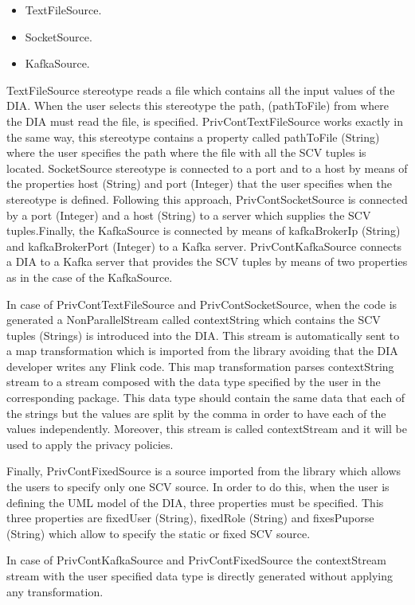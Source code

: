 \begin{itemize}
\item TextFileSource.
\item SocketSource.
\item KafkaSource.
\end{itemize}

TextFileSource stereotype reads a file which contains all the input values of the DIA. When the user selects this stereotype the path, (pathToFile) from where the DIA must read the file, is specified. PrivContTextFileSource works exactly in the same way, this stereotype contains a property called pathToFile (String) where the user specifies the path where the file with all the SCV tuples is located. SocketSource stereotype is connected to a port and to a host by means of the properties host (String) and port (Integer) that the user specifies when the stereotype is defined. Following this approach, PrivContSocketSource is connected by a port (Integer) and a host (String) to a server which supplies the SCV tuples.Finally, the KafkaSource is connected by means of kafkaBrokerIp (String) and kafkaBrokerPort (Integer) to a Kafka server. PrivContKafkaSource connects a DIA to a Kafka server that provides the SCV tuples by means of two properties as in the case of the KafkaSource.

In case of PrivContTextFileSource and PrivContSocketSource, when the code is generated a NonParallelStream called contextString which contains the SCV tuples (Strings) is introduced into the DIA. This stream is automatically sent to a map transformation which is imported from the library avoiding that the DIA developer writes any Flink code. This map transformation parses contextString stream to a stream composed with the data type specified by the user in the corresponding package. This data type should contain the same data that each of the strings but the values are split by the comma in order to have each of the values independently. Moreover, this stream is called contextStream and it will be used to apply the privacy policies.

Finally, PrivContFixedSource is a source imported from the library which allows the users to specify only one SCV source. In order to do this, when the user is defining the UML model of the DIA, three properties must be specified. This three properties are fixedUser (String), fixedRole (String) and fixesPuporse (String) which allow to specify the static or fixed SCV source.

In case of PrivContKafkaSource and PrivContFixedSource the contextStream stream with the user specified data type is directly generated without applying any transformation.

